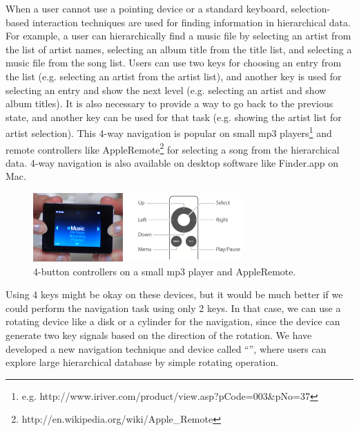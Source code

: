 \documentclass{article}
\begin{document}
When a user cannot use a pointing device or a standard keyboard,
selection-based interaction techniques are used for
finding information in hierarchical data.
For example, a user can hierarchically find a music file by
selecting an artist from the list of artist names,
selecting an album title from the title list,
and selecting a music file from the song list.
Users can use two keys for choosing an entry from the list
(e.g. selecting an artist from the artist list),
and another key is used for selecting an entry and show the next level
(e.g. selecting an artist and show album titles).
It is also necessary to provide a way to go back to the previous state, and
another key can be used for that task
(e.g. showing the artist list for artist selection).
%
This 4-way navigation is popular on small mp3 players\footnote{
  e.g. http://www.iriver.com/product/view.asp?pCode=003\&pNo=37
} and remote controllers like AppleRemote\footnote{http://en.wikipedia.org/wiki/Apple\_Remote}
for selecting a song from the hierarchical data.
4-way navigation is also available on desktop software like Finder.app on Mac.

\begin{figure}[H]
\centerline{\includegraphics[width=80mm,bb=0 0 547 179]{figures/4buttons.png}}
\caption{4-button controllers on a small mp3 player and AppleRemote.}
\label{u10}
\end{figure}



Using 4 keys might be okay on these devices, but it would be much better
if we could perform the navigation task using only 2 keys.
In that case, we can use a rotating device like a disk or a cylinder for the navigation,
since the device can generate two key signals based on the direction of the rotation.
%
%
We have developed a new navigation technique and device called ``{\ST}'',
where users can explore large hierarchical database by simple rotating operation.
\end{document}
